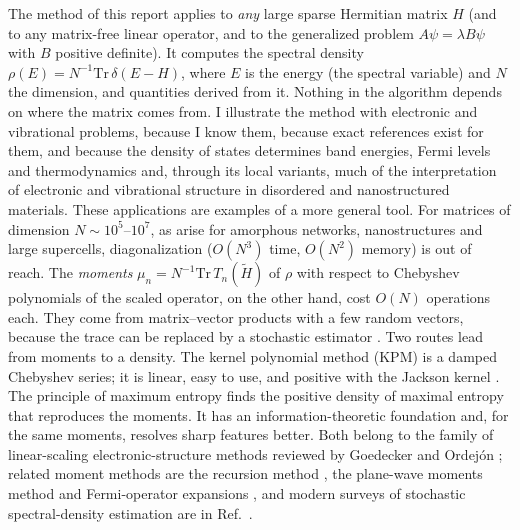 \documentclass[reprint,nofootinbib,superscriptaddress,amsmath,amssymb,aps,prb,floatfix]{revtex4-2}
\newcommand{\Tr}{\mathrm{Tr}}
\begin{document}
The method of this report applies to \emph{any} large sparse Hermitian matrix $H$ (and to any matrix-free linear operator, and to the generalized problem $A\psi=\lambda B\psi$ with $B$ positive definite). It computes the spectral density $\rho(E)=N^{-1}\Tr\,\delta(E-H)$, where $E$ is the energy (the spectral variable) and $N$ the dimension, and quantities derived from it. Nothing in the algorithm depends on where the matrix comes from. I illustrate the method with electronic and vibrational problems, because I know them, because exact references exist for them, and because the density of states determines band energies, Fermi levels and thermodynamics and, through its local variants, much of the interpretation of electronic and vibrational structure in disordered and nanostructured materials. These applications are examples of a more general tool.
For matrices of dimension $N\sim10^5$--$10^7$, as arise for amorphous networks, nanostructures and large supercells, diagonalization ($O(N^3)$ time, $O(N^2)$ memory) is out of reach. The \emph{moments} $\mu_n=N^{-1}\Tr\,T_n(\tilde H)$ of $\rho$ with respect to Chebyshev polynomials of the scaled operator, on the other hand, cost $O(N)$ operations each. They come from matrix--vector products with a few random vectors, because the trace can be replaced by a stochastic estimator \cite{skilling,hutchinson}.
Two routes lead from moments to a density. The kernel polynomial method (KPM) \cite{silver1994,silver1996,kpm} is a damped Chebyshev series; it is linear, easy to use, and positive with the Jackson kernel \cite{jackson}. The principle of maximum entropy \cite{mead,turek,drabold1993} finds the positive density of maximal entropy that reproduces the moments. It has an information-theoretic foundation \cite{jaynes1978} and, for the same moments, resolves sharp features better.
Both belong to the family of linear-scaling electronic-structure methods reviewed by Goedecker \cite{goedecker} and Ordej\'on \cite{ordejon1998}; related moment methods are the recursion method \cite{haydock}, the plane-wave moments method \cite{wang1994} and Fermi-operator expansions \cite{goedeckercolombo}, and modern surveys of stochastic spectral-density estimation are in Ref.~\cite{lin}.
\end{document}
